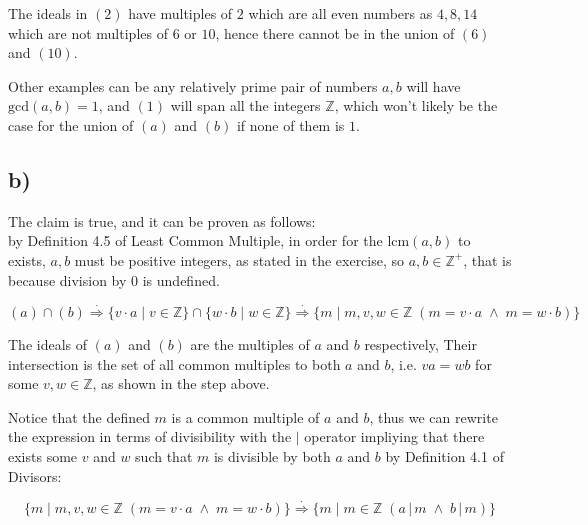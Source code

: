 \documentclass[unicode,11pt,a4paper,oneside,numbers=endperiod,openany]{scrartcl}
\def\Z{\mathbb{Z}}
\def\Zp{\mathbb{Z}^+}
\def\gcd{\textrm{gcd}}
\def\lcm{\textrm{lcm}}
\newcommand{\pstep}{\overset{.}{\Longrightarrow}}
\begin{document}
The ideals in \( (2) \) have multiples of \( 2 \) which are all even numbers as \( 4, 8, 14 \) 
which are not multiples of \( 6 \) or \( 10 \),
hence there cannot be in the union of \( (6) \) and \( (10) \).

Other examples can be any relatively prime pair of numbers \( a, b \) will have \( \gcd(a, b) = 1 \),
and \( (1) \) will span all the integers \( \Z \),
which won't likely be the case for the union of \( (a) \) and \( (b) \) if none of them is \( 1 \).


\subsection*{b)}

The claim is true, and it can be proven as follows: \\
by Definition 4.5 of Least Common Multiple, 
in order for the \( \lcm(a, b) \) to exists, \( a, b \) must be positive integers,
as stated in the exercise, so \( a, b \in \Zp \), that is because division by \( 0 \) is undefined.

\[
    (a) \cap (b) 
    \pstep 
    \{ v \cdot a \mid v \in \Z \} \cap \{ w \cdot b \mid w \in \Z \}
    \pstep
    \{ m \mid m, v, w \in \Z \; 
        \left( 
            m = v \cdot a  
            \; \land \; 
            m = w \cdot b
        \right) 
    \}
\]

The ideals of \( (a) \) and \( (b) \) are the multiples of \( a \) and \( b \) respectively,
Their intersection is the set of all common multiples to both \( a \) and \( b \), 
i.e. \( va = wb \) for some \( v, w \in \Z \),
as shown in the step above. 

Notice that the defined \( m \) is a common multiple of \( a \) and \( b \),
thus we can rewrite the expression in terms of divisibility with the \( | \) operator 
impliying that there exists some \( v \) and \( w \) 
such that \( m \) is divisible by both \( a \) and \( b \) by Definition 4.1 of Divisors:

\[
    \{ m \mid m, v, w \in \Z \; 
        \left( 
            m = v \cdot a  
            \; \land \; 
            m = w \cdot b
        \right) 
    \}
    \pstep
    \{ m \mid m \in \Z \; 
        \left( 
            a \, | \, m  
            \; \land \; 
            b \, | \, m
        \right) 
    \}
\]
\end{document}
